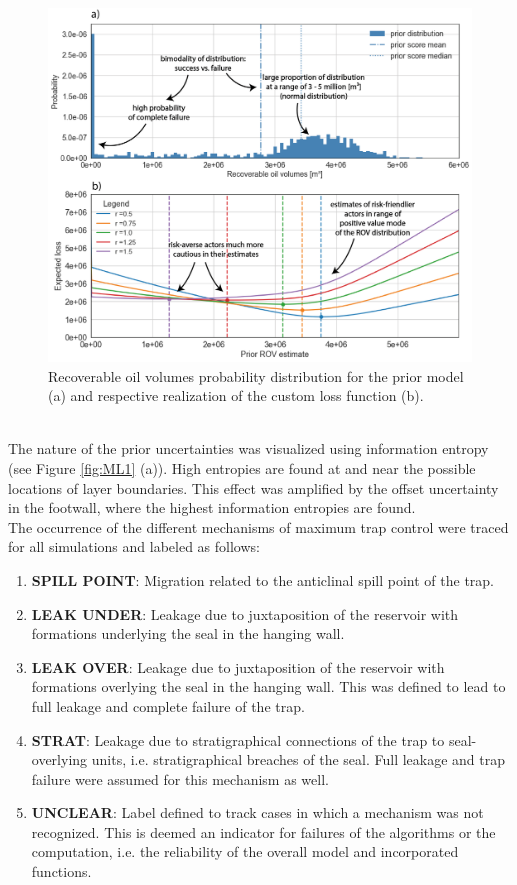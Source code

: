 		\begin{figure}[h]
			\centering
			\includegraphics[width=1\textwidth]{Figures/M_prior}
			\caption{Recoverable oil volumes probability distribution for the prior model (a) and respective realization of the custom loss function (b).}\label{fig:M_prior}
		\end{figure}\\
		The nature of the prior uncertainties was visualized using information entropy (see Figure \ref{fig:ML1} (a)). High entropies are found at and near the possible locations of layer boundaries. This effect was amplified by the offset uncertainty in the footwall, where the highest information entropies are found.\\
		The occurrence of the different mechanisms of maximum trap control were traced for all simulations and labeled as follows:
		\begin{enumerate}
		\item \textbf{SPILL POINT}: Migration related to the anticlinal spill point of the trap.
		\item \textbf{LEAK UNDER}: Leakage due to juxtaposition of the reservoir with formations underlying the seal in the hanging wall.
		\item \textbf{LEAK OVER}: Leakage due to juxtaposition of the reservoir with formations overlying the seal in the hanging wall. This was defined to lead to full leakage and complete failure of the trap.
		\item \textbf{STRAT}: Leakage due to stratigraphical connections of the trap to seal-overlying units, i.e. stratigraphical breaches of the seal. Full leakage and trap failure were assumed for this mechanism as well.
		\item \textbf{UNCLEAR}: Label defined to track cases in which a mechanism was not recognized. This is deemed an indicator for failures of the algorithms or the computation, i.e. the reliability of the overall model and incorporated functions. 
		\end{enumerate}
